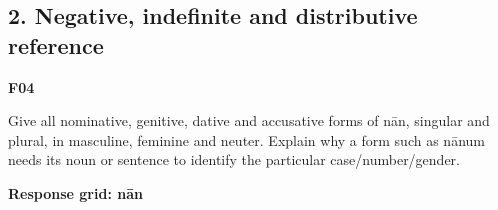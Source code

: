 \par\begin{minipage}{\linewidth}\raggedright
\subsection*{2. Negative, indefinite and distributive reference}


\textbf{F04}

Give all nominative, genitive, dative and accusative forms of nān, singular and plural, in masculine, feminine and neuter. Explain why a form such as nānum needs its noun or sentence to identify the particular case/\allowbreak{}number/\allowbreak{}gender.

\textbf{Response grid: nān}


\end{minipage}

